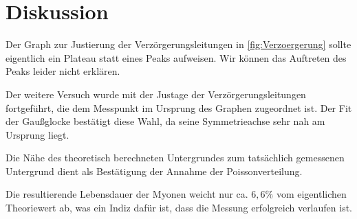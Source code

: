 \newpage
\section{Diskussion}
    Der Graph zur Justierung der Verzörgerungsleitungen in \autoref{fig:Verzoergerung} sollte eigentlich ein Plateau statt eines Peaks aufweisen. Wir können das Auftreten des Peaks leider nicht erklären.

    Der weitere Versuch wurde mit der Justage der Verzörgerungsleitungen fortgeführt, die dem Messpunkt im Ursprung des Graphen zugeordnet ist. Der Fit der Gaußglocke bestätigt diese Wahl, da seine Symmetrieachse sehr nah am Ursprung liegt.

    Die Nähe des theoretisch berechneten Untergrundes zum tatsächlich gemessenen Untergrund dient als Bestätigung der Annahme der Poissonverteilung.

    Die resultierende Lebensdauer der Myonen weicht nur ca. $6,6 \%$ vom eigentlichen Theoriewert ab, was ein Indiz dafür ist, dass die Messung erfolgreich verlaufen ist.

    


